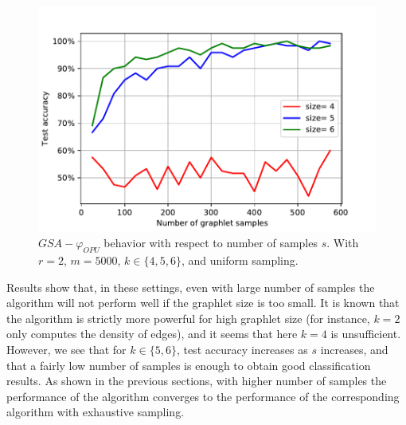 \begin{figure}[H]
\centering
\includegraphics[scale=0.6]{figs/samples_num.pdf}
\caption[$GSA-\varphi_{OPU}$ behavior with respect to number of samples $s$]{$GSA-\varphi_{OPU}$ behavior with respect to number of samples $s$. With $r=2$, $m=5000$, $k\in\{4,5,6\}$, and uniform sampling.}
\label{fig:varying_samples_num}
\end{figure}
Results show that, in these settings, even with large number of samples the algorithm will not perform well if the graphlet size is too small. It is known that the algorithm is strictly more powerful for high graphlet size (for instance, $k=2$ only computes the density of edges), and it seems that here $k=4$ is unsufficient. %
However, we see that for $k\in\{5,6\}$, test accuracy increases as $s$ increases, and that a fairly low number of samples is enough to obtain good classification results. As shown in the previous sections, with higher number of samples the performance of the algorithm converges to the performance of the corresponding algorithm with exhaustive sampling.

